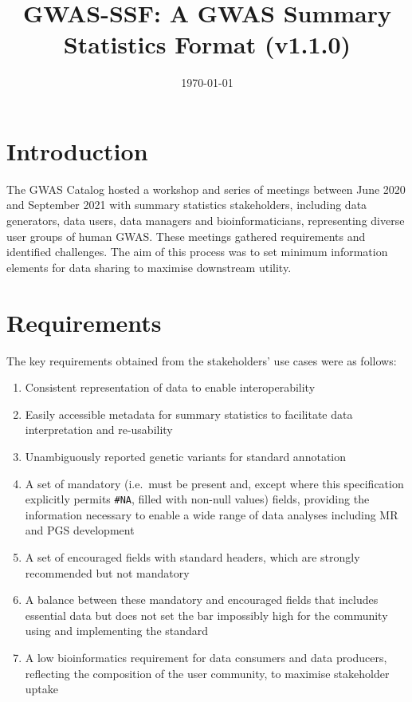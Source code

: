 \documentclass[11pt]{article}
\title{GWAS-SSF: A GWAS Summary Statistics Format (v1.1.0)}
\date{\today}
\begin{document}
\maketitle

\newpage
\tableofcontents

\newpage

\section{Introduction}
The GWAS Catalog hosted a workshop and series of meetings between June 2020 and September 2021 with summary statistics stakeholders, including data generators, data users, data managers and bioinformaticians, representing diverse user groups of human GWAS. These meetings gathered requirements and identified challenges. The aim of this process was to set minimum information elements for data sharing to maximise downstream utility.

\section{Requirements}

The key requirements obtained from the stakeholders’ use cases were as follows:

\begin{enumerate}
\item Consistent representation of data to enable interoperability
\item Easily accessible metadata for summary statistics to facilitate data interpretation and re-usability
\item Unambiguously reported genetic variants for standard annotation
\item A set of mandatory (i.e.\ must be present and, except where this specification explicitly permits \texttt{\#NA}, filled with non-null values) fields, providing the information necessary to enable a wide range of data analyses including MR and PGS development
\item A set of encouraged fields with standard headers, which are strongly recommended but not mandatory 
\item A balance between these mandatory and encouraged fields that includes essential data but does not set the bar impossibly high for the community using and implementing the standard
\item A low bioinformatics requirement for data consumers and data producers, reflecting the composition of the user community, to maximise stakeholder uptake 
\end{enumerate}
\end{document}
